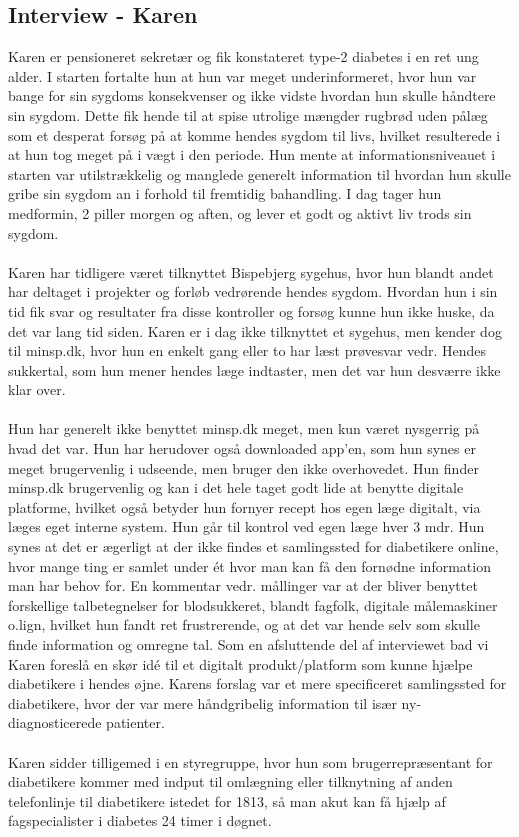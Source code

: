 \subsection*{Interview - Karen}
Karen er pensioneret sekretær og fik konstateret type-2 diabetes i en ret ung alder. I starten fortalte hun at hun var meget underinformeret, hvor hun var bange for sin sygdoms konsekvenser og ikke vidste hvordan hun skulle håndtere sin sygdom. Dette fik hende til at spise utrolige mængder rugbrød uden pålæg som et desperat forsøg på at komme hendes sygdom til livs, hvilket resulterede i at hun tog meget på i vægt i den periode. Hun mente at informationsniveauet i starten var utilstrækkelig og manglede generelt information til hvordan hun skulle gribe sin sygdom an i forhold til fremtidig bahandling. I dag tager hun medformin, 2 piller morgen og aften, og lever et godt og aktivt liv trods sin sygdom.
\\ \\
Karen har tidligere været tilknyttet Bispebjerg sygehus, hvor hun blandt andet har deltaget i projekter og forløb vedrørende hendes sygdom. Hvordan hun i sin tid fik svar og resultater fra disse kontroller og forsøg kunne hun ikke huske, da det var lang tid siden. Karen er i dag ikke tilknyttet et sygehus, men kender dog til minsp.dk, hvor hun en enkelt gang eller to har læst prøvesvar vedr. Hendes sukkertal, som hun mener hendes læge indtaster, men det var hun desværre ikke klar over. 
\\ \\
Hun har generelt ikke benyttet minsp.dk meget, men kun været nysgerrig på hvad det var. Hun har herudover også downloaded app'en, som hun synes er meget brugervenlig i udseende, men bruger den ikke overhovedet. Hun finder minsp.dk brugervenlig og kan i det hele taget godt lide at benytte digitale platforme, hvilket også betyder hun fornyer recept hos egen læge digitalt, via læges eget interne system. Hun går til kontrol ved egen læge hver 3 mdr. Hun synes at det er ægerligt at der ikke findes et samlingssted for diabetikere online, hvor mange ting er samlet under ét hvor man kan få den fornødne information man har behov for. En kommentar vedr. mållinger var at der bliver benyttet forskellige talbetegnelser for blodsukkeret, blandt fagfolk, digitale målemaskiner o.lign, hvilket hun fandt ret frustrerende, og at det var hende selv som skulle finde information og omregne tal. 
Som en afsluttende del af interviewet bad vi Karen foreslå en skør idé til et digitalt produkt/platform som kunne hjælpe diabetikere i hendes øjne. Karens forslag var et mere specificeret samlingssted for diabetikere, hvor der var mere håndgribelig information til især ny-diagnosticerede patienter.
\\ \\
Karen sidder tilligemed i en styregruppe, hvor hun som brugerrepræsentant for diabetikere kommer med indput til omlægning eller tilknytning af anden telefonlinje til diabetikere istedet for 1813, så man akut kan få hjælp af fagspecialister i diabetes 24 timer i døgnet.

